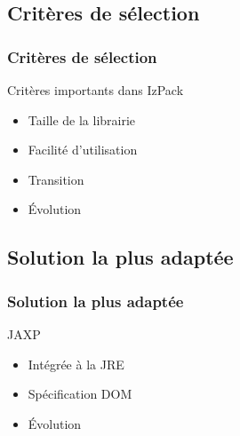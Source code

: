 \subsection{Critères de sélection}
\begin{frame}\frametitle{Critères de sélection}
\begin{beamerboxesrounded}[shadow=true]{Critères importants dans IzPack}
\begin{itemize}
	\item Taille de la librairie
	\item Facilité d'utilisation
	\item Transition
	\item \'Evolution
\end{itemize}
\end{beamerboxesrounded}
\end{frame}
\subsection{Solution la plus adaptée}
\begin{frame}\frametitle{Solution la plus adaptée}
\begin{beamerboxesrounded}[shadow=true]{JAXP}
\begin{itemize}
	\item Intégrée à la JRE
	\item Spécification DOM
	\item \'Evolution
\end{itemize}
\end{beamerboxesrounded}
\end{frame}

